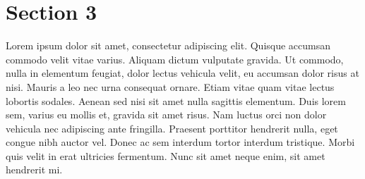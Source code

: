 \documentclass[12pt,letterpaper]{article}
\begin{document}
\section{Section 3}
Lorem ipsum dolor sit amet, consectetur adipiscing elit. Quisque accumsan commodo velit vitae varius. Aliquam dictum
vulputate gravida. Ut commodo, nulla in elementum feugiat, dolor lectus vehicula velit, eu accumsan dolor risus at nisi.
Mauris a leo nec urna consequat ornare. Etiam vitae quam vitae lectus lobortis sodales. Aenean sed nisi sit amet nulla
sagittis elementum. Duis lorem sem, varius eu mollis et, gravida sit amet risus. Nam luctus orci non dolor vehicula nec
adipiscing ante fringilla. Praesent porttitor hendrerit nulla, eget congue nibh auctor vel. Donec ac sem interdum tortor
interdum tristique. Morbi quis velit in erat ultricies fermentum. Nunc sit amet neque enim, sit amet hendrerit mi.
\end{document}
